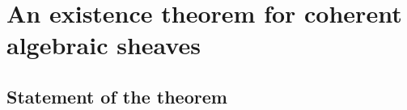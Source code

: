 \section{An existence theorem for coherent algebraic sheaves}
\label{section:3.5}


\subsection{Statement of the theorem}
\label{subsection:3.5.1}








